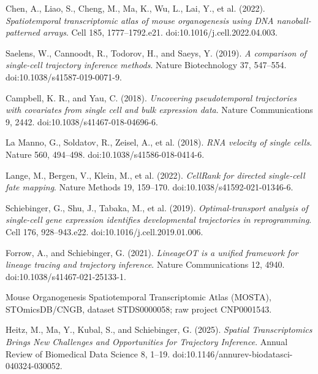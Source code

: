 \documentclass[11pt]{article}
\begin{document}
\begin{description}[leftmargin=1.2cm,labelwidth=1cm]
\item[R1.] Chen, A., Liao, S., Cheng, M., Ma, K., Wu, L., Lai, Y., et al. (2022).
\emph{Spatiotemporal transcriptomic atlas of mouse organogenesis using DNA nanoball-patterned arrays}.
Cell 185, 1777--1792.e21.
doi:10.1016/j.cell.2022.04.003.

\item[R2.] Saelens, W., Cannoodt, R., Todorov, H., and Saeys, Y. (2019).
\emph{A comparison of single-cell trajectory inference methods}.
Nature Biotechnology 37, 547--554.
doi:10.1038/s41587-019-0071-9.

\item[R3.] Campbell, K. R., and Yau, C. (2018).
\emph{Uncovering pseudotemporal trajectories with covariates from single cell and bulk expression data}.
Nature Communications 9, 2442.
doi:10.1038/s41467-018-04696-6.

\item[R4.] La Manno, G., Soldatov, R., Zeisel, A., et al. (2018).
\emph{RNA velocity of single cells}.
Nature 560, 494--498.
doi:10.1038/s41586-018-0414-6.

\item[R5.] Lange, M., Bergen, V., Klein, M., et al. (2022).
\emph{CellRank for directed single-cell fate mapping}.
Nature Methods 19, 159--170.
doi:10.1038/s41592-021-01346-6.

\item[R6.] Schiebinger, G., Shu, J., Tabaka, M., et al. (2019).
\emph{Optimal-transport analysis of single-cell gene expression identifies developmental trajectories in reprogramming}.
Cell 176, 928--943.e22.
doi:10.1016/j.cell.2019.01.006.

\item[R7.] Forrow, A., and Schiebinger, G. (2021).
\emph{LineageOT is a unified framework for lineage tracing and trajectory inference}.
Nature Communications 12, 4940.
doi:10.1038/s41467-021-25133-1.

\item[R8.] Mouse Organogenesis Spatiotemporal Transcriptomic Atlas (MOSTA), STOmicsDB/CNGB, dataset STDS0000058; raw project CNP0001543.

\item[R9.] Heitz, M., Ma, Y., Kubal, S., and Schiebinger, G. (2025).
\emph{Spatial Transcriptomics Brings New Challenges and Opportunities for Trajectory Inference}.
Annual Review of Biomedical Data Science 8, 1--19.
doi:10.1146/annurev-biodatasci-040324-030052.


\end{description}
\end{document}
